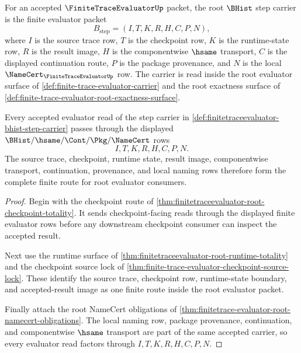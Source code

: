 \begin{definition}
\label{def:finitetraceevaluator-bhist-step-carrier}
For an accepted $\FiniteTraceEvaluatorUp$ packet, the root $\BHist$ step carrier is the finite evaluator packet
$$
B_{\mathrm{step}}=(I,T,K,R,H,C,P,N),
$$
where $I$ is the source trace row, $T$ is the checkpoint row, $K$ is the runtime-state row, $R$ is the result image, $H$ is the componentwise $\hsame$ transport, $C$ is the displayed continuation route, $P$ is the package provenance, and $N$ is the local $\NameCert_{\FiniteTraceEvaluatorUp}$ row. The carrier is read inside the root evaluator surface of \autoref{def:finite-trace-evaluator-carrier} and the root exactness surface of \autoref{def:finite-trace-evaluator-root-exactness-surface}.
\end{definition}

\begin{theorem}
\label{thm:finitetraceevaluator-route-totality}
Every accepted evaluator read of the step carrier in \autoref{def:finitetraceevaluator-bhist-step-carrier} passes through the displayed $\BHist/\hsame/\Cont/\Pkg/\NameCert$ rows
$$
I,T,K,R,H,C,P,N.
$$
The source trace, checkpoint, runtime state, result image, componentwise transport, continuation, provenance, and local naming rows therefore form the complete finite route for root evaluator consumers.
\end{theorem}
\begin{proof}
Begin with the checkpoint route of \autoref{thm:finitetraceevaluator-root-checkpoint-totality}. It sends checkpoint-facing reads through the displayed finite evaluator rows before any downstream checkpoint consumer can inspect the accepted result.

Next use the runtime surface of \autoref{thm:finitetraceevaluator-root-runtime-totality} and the checkpoint source lock of \autoref{thm:finite-trace-evaluator-checkpoint-source-lock}. These identify the source trace, checkpoint row, runtime-state boundary, and accepted-result image as one finite route inside the root evaluator packet.

Finally attach the root NameCert obligations of \autoref{thm:finitetrace-evaluator-root-namecert-obligations}. The local naming row, package provenance, continuation, and componentwise $\hsame$ transport are part of the same accepted carrier, so every evaluator read factors through $I,T,K,R,H,C,P,N$.
\end{proof}

